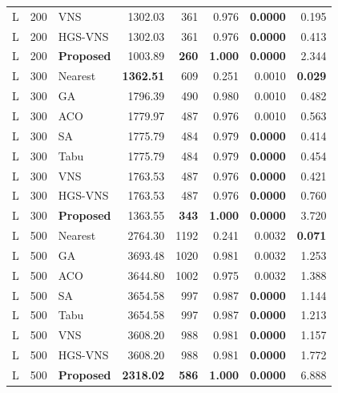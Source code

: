 \begin{longtable}{@{}rrlrrrrr@{}}
L & 200 & VNS & 1302.03 & 361 & 0.976 & \textbf{0.0000} & 0.195 \\

L & 200 & HGS-VNS & 1302.03 & 361 & 0.976 & \textbf{0.0000} & 0.413 \\
\rowcolor{gray!10}
L & 200 & \textbf{Proposed} & 1003.89 & \textbf{260} & \textbf{1.000} & \textbf{0.0000} & 2.344 \\
\addlinespace[2pt]

L & 300 & Nearest & \textbf{1362.51} & 609 & 0.251 & 0.0010 & \textbf{0.029} \\

L & 300 & GA & 1796.39 & 490 & 0.980 & 0.0010 & 0.482 \\

L & 300 & ACO & 1779.97 & 487 & 0.976 & 0.0010 & 0.563 \\

L & 300 & SA & 1775.79 & 484 & 0.979 & \textbf{0.0000} & 0.414 \\

L & 300 & Tabu & 1775.79 & 484 & 0.979 & \textbf{0.0000} & 0.454 \\

L & 300 & VNS & 1763.53 & 487 & 0.976 & \textbf{0.0000} & 0.421 \\

L & 300 & HGS-VNS & 1763.53 & 487 & 0.976 & \textbf{0.0000} & 0.760 \\
\rowcolor{gray!10}
L & 300 & \textbf{Proposed} & 1363.55 & \textbf{343} & \textbf{1.000} & \textbf{0.0000} & 3.720 \\
\addlinespace[2pt]

L & 500 & Nearest & 2764.30 & 1192 & 0.241 & 0.0032 & \textbf{0.071} \\

L & 500 & GA & 3693.48 & 1020 & 0.981 & 0.0032 & 1.253 \\

L & 500 & ACO & 3644.80 & 1002 & 0.975 & 0.0032 & 1.388 \\

L & 500 & SA & 3654.58 & 997 & 0.987 & \textbf{0.0000} & 1.144 \\

L & 500 & Tabu & 3654.58 & 997 & 0.987 & \textbf{0.0000} & 1.213 \\

L & 500 & VNS & 3608.20 & 988 & 0.981 & \textbf{0.0000} & 1.157 \\

L & 500 & HGS-VNS & 3608.20 & 988 & 0.981 & \textbf{0.0000} & 1.772 \\
\rowcolor{gray!10}
L & 500 & \textbf{Proposed} & \textbf{2318.02} & \textbf{586} & \textbf{1.000} & \textbf{0.0000} & 6.888 \\
\bottomrule
\end{longtable}
\endgroup
